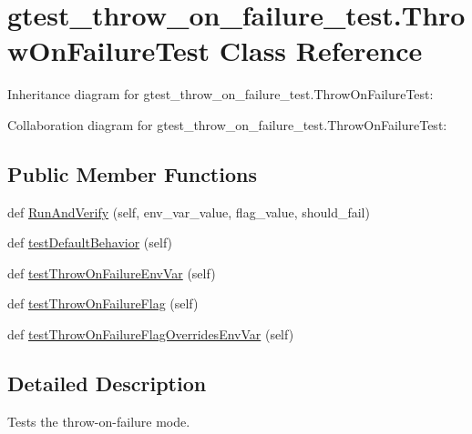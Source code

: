 \hypertarget{classgtest__throw__on__failure__test_1_1_throw_on_failure_test}{}\section{gtest\+\_\+throw\+\_\+on\+\_\+failure\+\_\+test.\+Throw\+On\+Failure\+Test Class Reference}
\label{classgtest__throw__on__failure__test_1_1_throw_on_failure_test}


Inheritance diagram for gtest\+\_\+throw\+\_\+on\+\_\+failure\+\_\+test.\+Throw\+On\+Failure\+Test\+:


Collaboration diagram for gtest\+\_\+throw\+\_\+on\+\_\+failure\+\_\+test.\+Throw\+On\+Failure\+Test\+:
\subsection*{Public Member Functions}
\begin{DoxyCompactItemize}
\item 
def \hyperlink{classgtest__throw__on__failure__test_1_1_throw_on_failure_test_a29114050e4e9163d8b046451a9850839}{Run\+And\+Verify} (self, env\+\_\+var\+\_\+value, flag\+\_\+value, should\+\_\+fail)
\item 
def \hyperlink{classgtest__throw__on__failure__test_1_1_throw_on_failure_test_a596d5e2dbeb51751a6fb6d3852fdd54a}{test\+Default\+Behavior} (self)
\item 
def \hyperlink{classgtest__throw__on__failure__test_1_1_throw_on_failure_test_af1cecdf19bf8ff7261e9f832c4d1b3ad}{test\+Throw\+On\+Failure\+Env\+Var} (self)
\item 
def \hyperlink{classgtest__throw__on__failure__test_1_1_throw_on_failure_test_ae1383974161c2d1dc8b5e74ebc12db38}{test\+Throw\+On\+Failure\+Flag} (self)
\item 
def \hyperlink{classgtest__throw__on__failure__test_1_1_throw_on_failure_test_ab63f8f491aeaaa04ba3fc7ae3bca6de8}{test\+Throw\+On\+Failure\+Flag\+Overrides\+Env\+Var} (self)
\end{DoxyCompactItemize}


\subsection{Detailed Description}
\begin{DoxyVerb}Tests the throw-on-failure mode.\end{DoxyVerb}
 

